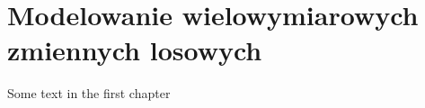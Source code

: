 \chapter{Modelowanie wielowymiarowych zmiennych losowych}

Some text in the first chapter


\mgrclosechapter